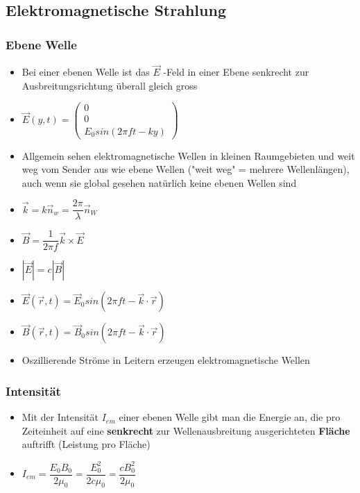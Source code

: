 \documentclass[8pt,a4paper]{scrartcl}
\begin{document}
\begin{multicols*}{3}
					
				\subsection{Elektromagnetische Strahlung}		
					\subsubsection{Ebene Welle}
						\begin{itemize}\itemsep0pt
							\item Bei einer ebenen Welle ist
das $\overrightarrow{E}$ -Feld in einer Ebene senkrecht zur Ausbreitungsrichtung überall gleich gross
							\item $\overrightarrow{E}(y,t) = \begin{pmatrix}0\\0\\E_{0}sin(2\pi ft-ky)\end{pmatrix}$
							\item Allgemein sehen elektromagnetische Wellen in kleinen Raumgebieten und weit weg vom Sender aus wie ebene Wellen ("weit weg" = mehrere Wellenlängen), auch wenn sie global gesehen natürlich keine ebenen Wellen sind
							\item $\overrightarrow{k}=k\overrightarrow{n}_{w}=\dfrac{2\pi}{\lambda}\overrightarrow{n}_{W}$
							\item $\overrightarrow{B}=\dfrac{1}{2\pi f}\overrightarrow{k}\times \overrightarrow{E}$
							\item $|\overrightarrow{E}| = c|\overrightarrow{B}|$
							\item $\overrightarrow{E}(\overrightarrow{r},t) = \overrightarrow{E}_{0}sin(2\pi ft-\overrightarrow{k}\cdot \overrightarrow{r})$
							\item $\overrightarrow{B}(\overrightarrow{r},t) = \overrightarrow{B}_{0}sin(2\pi ft-\overrightarrow{k}\cdot \overrightarrow{r})$
							\item Oszillierende Ströme in Leitern erzeugen elektromagnetische Wellen
							
						\end{itemize}	
					\subsubsection{Intensität}
						\begin{itemize}\itemsep0pt
							\item Mit der Intensität $I_{em}$ einer ebenen Welle gibt man die Energie an, die pro Zeiteinheit auf eine \textbf{senkrecht} zur Wellenausbreitung ausgerichteten \textbf{Fläche} auftrifft (Leistung pro Fläche)
							\item $I_{em}=\dfrac{E_{0}B_{0}}{2\mu_{0}}=\dfrac{E_{0}^{2}}{2c\mu_{0}} = \dfrac{cB_{0}^{2}}{2\mu_{0}}$
						\end{itemize}
						

\end{multicols*}
\end{document}
